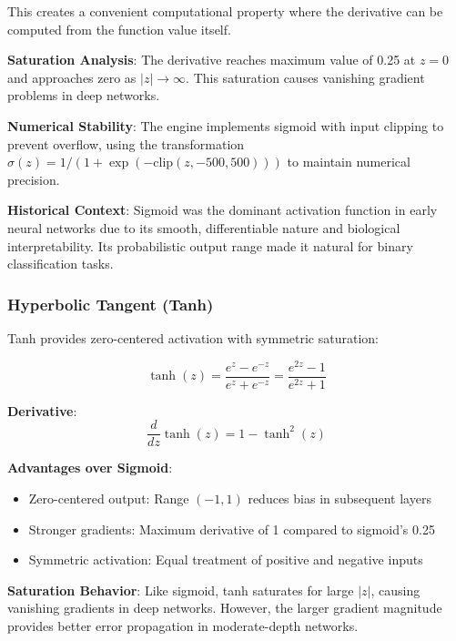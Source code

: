 \documentclass[11pt,a4paper]{report}
\begin{document}
This creates a convenient computational property where the derivative can be computed from the function value itself.

\textbf{Saturation Analysis}: The derivative reaches maximum value of 0.25 at $z = 0$ and approaches zero as $|z| \rightarrow \infty$. This saturation causes vanishing gradient problems in deep networks.

\textbf{Numerical Stability}: The engine implements sigmoid with input clipping to prevent overflow, using the transformation $\sigma(z) = 1/(1 + \exp(-\text{clip}(z, -500, 500)))$ to maintain numerical precision.

\textbf{Historical Context}: Sigmoid was the dominant activation function in early neural networks due to its smooth, differentiable nature and biological interpretability. Its probabilistic output range made it natural for binary classification tasks.

\subsubsection{Hyperbolic Tangent (Tanh)}

Tanh provides zero-centered activation with symmetric saturation:

\begin{equation}
\tanh(z) = \frac{e^z - e^{-z}}{e^z + e^{-z}} = \frac{e^{2z} - 1}{e^{2z} + 1}
\end{equation}

\textbf{Derivative}:
\begin{equation}
\frac{d}{dz}\tanh(z) = 1 - \tanh^2(z)
\end{equation}

\textbf{Advantages over Sigmoid}:
\begin{itemize}
\item Zero-centered output: Range $(-1, 1)$ reduces bias in subsequent layers
\item Stronger gradients: Maximum derivative of 1 compared to sigmoid's 0.25
\item Symmetric activation: Equal treatment of positive and negative inputs
\end{itemize}

\textbf{Saturation Behavior}: Like sigmoid, tanh saturates for large $|z|$, causing vanishing gradients in deep networks. However, the larger gradient magnitude provides better error propagation in moderate-depth networks.
\end{document}
